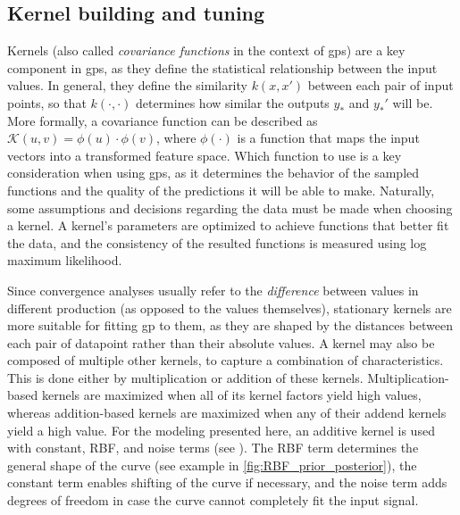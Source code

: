 \subsection{Kernel building and tuning}
\label{subsec:covariance_functions}


Kernels (also called \textit{covariance functions} in the context of \acp{gp}) are a key component in \acp{gp}, as they define the statistical relationship between the input values.
In general, they define the similarity $k(x, x')$ between each pair of input points, so that $k(\cdot, \cdot)$ determines how similar the outputs $y_*$ and $y_*'$ will be. 
More formally, a covariance function can be described as $\mathcal{K}(u, v) = \phi(u) \cdot \phi(v)$, where $\phi(\cdot)$ is a function that maps the input vectors into a transformed feature space.
Which function to use is a key consideration when using \acp{gp}, as it determines the behavior of the sampled functions and the quality of the predictions it will be able to make.
Naturally, some assumptions and decisions regarding the data must be made when choosing a kernel.
A kernel's parameters are optimized to achieve functions that better fit the data, and the consistency of the resulted functions is measured using log maximum likelihood.

Since convergence analyses usually refer to the \textit{difference} between values in different production (as opposed to the values themselves), stationary kernels are more suitable for fitting \ac{gp} to them, as they are shaped by the distances between each pair of datapoint rather than their absolute values.
A kernel may also be composed of multiple other kernels, to capture a combination of characteristics.
This is done either by multiplication or addition of these kernels.
Multiplication-based kernels are maximized when all of its kernel factors yield high values, whereas
addition-based kernels are maximized when any of their addend kernels yield a high value.
For the modeling presented here, an additive kernel is used with constant, RBF, and noise terms (see ).
The RBF term determines the general shape of the curve (see example in \cref{fig:RBF_prior_posterior}), the constant term enables shifting of the curve if necessary, and the noise term adds degrees of freedom in case the curve cannot completely fit the input signal.

